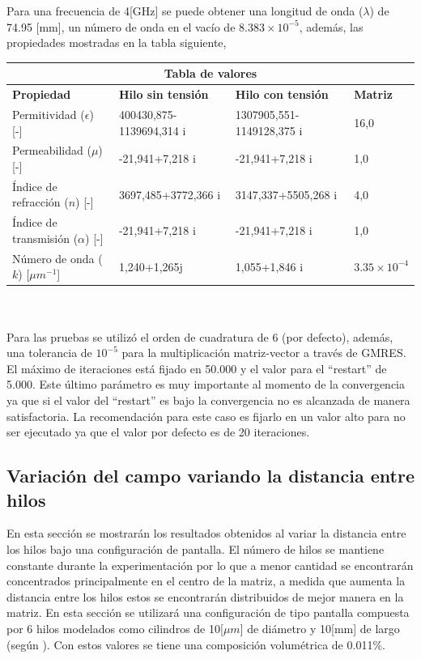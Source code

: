 \documentclass[12pt,letterpaper]{article}
\numberwithin{equation}{section}
\begin{document}
Para una frecuencia de 4[GHz] se puede obtener una longitud de onda ($\lambda$) de 74.95 [mm], un número de onda en el vacío de $8.383\times10^{-5}$, además, las propiedades mostradas en la tabla siguiente,\\

\hspace{-15mm}
\begin{tabular}{ |p{4.78cm}||p{4.6cm}|p{4.8cm}|p{3cm}|  }
	\hline
	\multicolumn{4}{|c|}{\textbf{Tabla de valores}} \\
	\hline
	\textbf{Propiedad} & \textbf{Hilo sin tensión} & \textbf{Hilo con tensión} & \textbf{Matriz}\\
	\hline
	Permitividad ($\epsilon$) [-]  & 400430,875-1139694,314 i   & 1307905,551-1149128,375 i & 16,0\\
	Permeabilidad ($\mu$) [-]&   -21,941+7,218 i  & -21,941+7,218 i & 1,0\\
	Índice de refracción ($n$) [-] & 3697,485+3772,366 i & 3147,337+5505,268 i & 4,0\\
	Índice de transmisión ($\alpha$) [-]   & -21,941+7,218 i & -21,941+7,218 i & 1,0\\
	Número de onda ($k$) [$\mu m^{-1}$] & 1,240+1,265j & 1,055+1,846 i &$3.35\times 10^{-4}$\\
	\hline
\end{tabular}
\\\\

Para las pruebas se utilizó el orden de cuadratura de 6 (por defecto), además, una tolerancia de $10^{-5}$ para la multiplicación matriz-vector a través de GMRES. El máximo de iteraciones está fijado en 50.000 y el valor para el ``restart'' de 5.000. Este último parámetro es muy importante al momento de la convergencia ya que si el valor del ``restart'' es bajo la convergencia no es alcanzada de manera satisfactoria. La recomendación para este caso es fijarlo en un valor alto para no ser ejecutado ya que el valor por defecto es de 20 iteraciones.

\pagebreak
\subsection{Variación del campo variando la distancia entre hilos}
En esta sección se mostrarán los resultados obtenidos al variar la distancia entre los hilos bajo una configuración de pantalla. El número de hilos se mantiene constante durante la experimentación por lo que a menor cantidad se encontrarán concentrados principalmente en el centro de la matriz, a medida que aumenta la distancia entre los hilos estos se encontrarán distribuidos de mejor manera en la matriz. En esta sección se utilizará una configuración de tipo pantalla compuesta por 6 hilos modelados como cilindros de 10[$\mu m$] de diámetro y 10[mm] de largo (según \cite{Wire_theory_1}). Con estos valores se tiene una composición volumétrica de 0.011\%.
\end{document}
